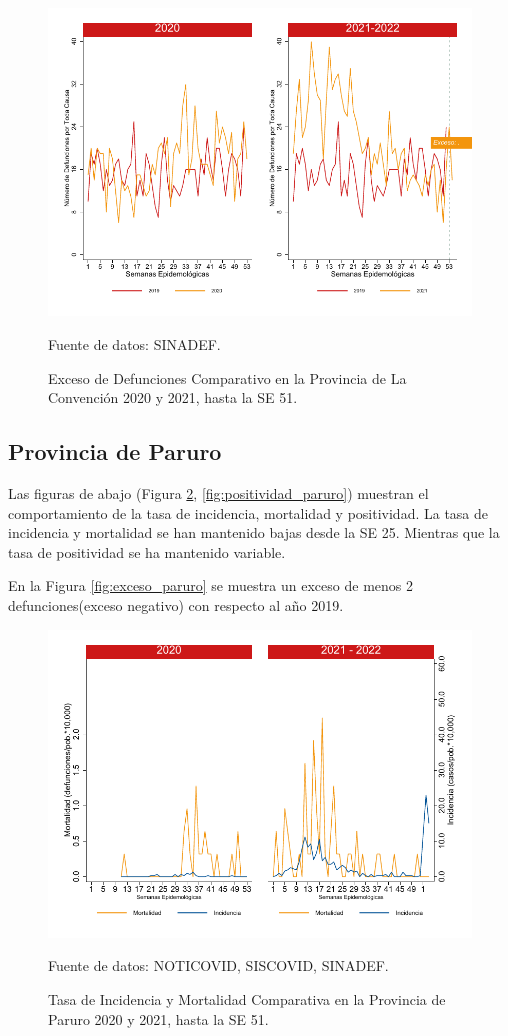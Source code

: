\documentclass[12pt,a4paper,openany]{book}
\begin{document}
		\begin{figure}[h]
			\caption{Exceso de Defunciones Comparativo en la Provincia de La Convención 2020 y 2021, hasta la SE 51.}\label{fig:exceso_laconv}
			\begin{center}
				\includegraphics[width=0.7\linewidth]{../figuras/exceso_9}
			\end{center}
			{\footnotesize {Fuente de datos: SINADEF.}}
		\end{figure}
		
		\clearpage
		
		\subsection*{Provincia de Paruro}
		\noindent Las figuras de abajo (Figura \ref{fig:inc_mort_paruro}, \ref{fig:positividad_paruro}) muestran el comportamiento de la tasa de incidencia, mortalidad y positividad. La tasa de incidencia y mortalidad se han mantenido bajas desde la SE 25.  Mientras que la tasa de positividad se ha mantenido variable.
	 
	 En la Figura \ref{fig:exceso_paruro} se muestra un exceso de menos 2 defunciones(exceso negativo) con respecto al año 2019.
		
		\begin{figure}[h]
			\caption{Tasa de Incidencia y Mortalidad Comparativa en la Provincia de Paruro 2020 y 2021, hasta la SE 51.}\label{fig:inc_mort_paruro}
			\begin{center}
				\includegraphics[width=0.7\linewidth]{../figuras/incidencia_mortalidad_20_21_10}
			\end{center}
			{\footnotesize {Fuente de datos: NOTICOVID, SISCOVID, SINADEF.}} 
		\end{figure}
		
\end{document}

